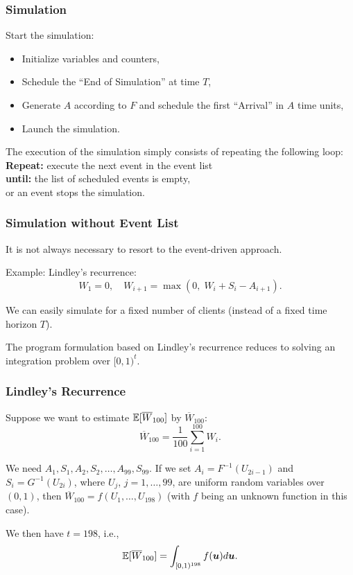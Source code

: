 \documentclass[t,usepdftitle=false,aspectratio=169]{beamer}
\def\bu{\boldsymbol{u}}
\begin{document}
\begin{frame}
	\frametitle{Simulation}
	
	Start the simulation:
	\begin{itemize}
		\item Initialize variables and counters,
		\item Schedule the ``End of Simulation'' at time $T$,
		\item Generate $A$ according to $F$ and schedule the first ``Arrival'' in $A$ time units,
		\item Launch the simulation.
	\end{itemize}
	
	\mbox{}
	
	The execution of the simulation simply consists of repeating the following loop:\\
	{\bf Repeat:} execute the next event
	in the event list\\
	{\bf until:} the list of scheduled events is empty,\\
	\quad    or an event stops the simulation.
	
\end{frame}

\begin{frame}
	\frametitle{Simulation without Event List}
	
	It is not always necessary to resort to the event-driven approach.
	
	\mbox{}
	
	Example: Lindley's recurrence:
	\[
	W_1 = 0,\quad W_{i+1} = \max(0,\; W_i + S_i - A_{i+1}).
	\]
	
	We can easily simulate for a fixed number of clients (instead of a fixed time horizon $T$).
	
	\mbox{}
	
	The program formulation based on Lindley's recurrence reduces to solving an integration problem over $[0,1)^t$.
	
\end{frame}

\begin{frame}
	\frametitle{Lindley's Recurrence}
	
	Suppose we want to estimate \({\mathbb{E}}[\overline{W}_{100}]\) by \({\overline{W}_{100}}\):
	\[
	{\overline{W}_{100}} = \frac{1}{100} \sum_{i=1}^{100} W_i.
	\]
	
	\mbox{}
	
	We need \(A_1, S_1, A_2, S_2, \dots, A_{99}, S_{99}\). If we set \({A_i} = F^{-1}(U_{2i-1})\) and \({S_i} = G^{-1}(U_{2i})\), where \(U_j\), \(j = 1,\ldots,99\), are uniform random variables over \((0,1)\), then \(\overline{W}_{100} = f(U_1,\dots,U_{198})\) (with \(f\) being an unknown function in this case).
	
	\mbox{}
	
	We then have \(t=198\), i.e., 
	\[
	\EE[\overline{W}_{100}] = \int_{[0,1)^{198}} f(\bu)d\bu.
	\]
	
\end{frame}
\end{document}
